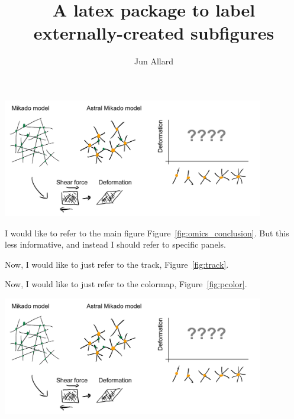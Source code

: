 \documentclass[onecolumn,11pt]{article}
\title{A latex package to label externally-created subfigures}
\author[a]{Jun Allard}
\affil[a]{University of California Irvine}
\date{} %
\begin{document}
\maketitle



\begin{busyfigure}[ht]
        \centering
        \includegraphics[width=4.5in]{figures/figJeanJacket.pdf}
\end{busyfigure}

I would like to refer to the main figure Figure~\ref{fig:omics_conclusion}. But this less informative, and instead I should refer to specific panels.

Now, I would like to just refer to the track, Figure~\ref{fig:track}.

Now, I would like to just refer to the colormap, Figure~\ref{fig:pcolor}.


\clearpage

\begin{busyfigure}[ht]
        \centering
        \includegraphics[width=4.5in]{figures/figJeanJacket.pdf}
\end{busyfigure}
\end{document}
